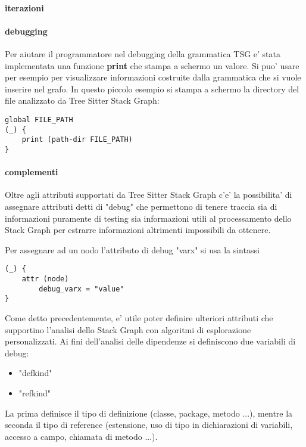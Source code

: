 \paragraph{iterazioni}

\paragraph{debugging}

Per aiutare il programmatore nel debugging della grammatica TSG e' stata implementata una funzione \textbf{print} che stampa a schermo un valore.
Si puo' usare per esempio per visualizzare informazioni costruite dalla grammatica che si vuole inserire nel grafo.
In questo piccolo esempio si stampa a schermo la directory del file analizzato da Tree Sitter Stack Graph:

\begin{verbatim}
global FILE_PATH
(_) {
    print (path-dir FILE_PATH)
}
\end{verbatim}

\paragraph{complementi}

Oltre agli attributi supportati da Tree Sitter Stack Graph c'e' la possibilita' di assegnare attributi detti di "debug" che permettono di tenere traccia sia di informazioni puramente di testing sia informazioni utili al processamento dello Stack Graph per estrarre informazioni altrimenti impossibili da ottenere.

Per assegnare ad un nodo l'attributo di debug "varx" si usa la sintassi

\begin{verbatim}
(_) {
    attr (node)
        debug_varx = "value"
}
\end{verbatim}

Come detto precedentemente, e' utile poter definire ulteriori attributi che supportino l'analisi dello Stack Graph con algoritmi di esplorazione personalizzati.
Ai fini dell'analisi delle dipendenze si definiscono due variabili di debug:

\begin{itemize}
    \item "defkind"
    \item "refkind"
\end{itemize}

La prima definisce il tipo di definizione (classe, package, metodo ...), mentre la seconda il tipo di reference (estensione, uso di tipo in dichiarazioni di variabili, accesso a campo, chiamata di metodo ...).
